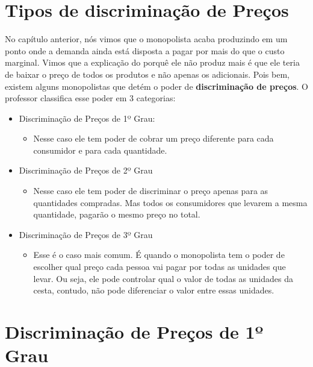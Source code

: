 \documentclass[a4paper,11pt,oneside]{book}
\theoremstyle{definition}
\theoremstyle{break}
\begin{document}
\section{Tipos de discriminação de Preços}

No capítulo anterior, nós vimos que o monopolista acaba produzindo em um ponto onde a demanda ainda está disposta a pagar por mais do que o custo marginal. Vimos que a explicação do porquê ele não produz mais é que ele teria de baixar o preço de todos os produtos e não apenas os adicionais. Pois bem, existem alguns monopolistas que detém o poder de \textbf{discriminação de preços}. O professor classifica esse poder em 3 categorias:

\begin{itemize}
\item Discriminação de Preços de 1º Grau:
	\begin{itemize}
	\item[] Nesse caso ele tem poder de cobrar um preço diferente para cada consumidor e para cada quantidade.
	\end{itemize}
\item Discriminação de Preços de 2º Grau
	\begin{itemize}
	\item[] Nesse caso ele tem poder de discriminar o preço apenas para as quantidades compradas. Mas todos os consumidores que levarem a mesma quantidade, pagarão o mesmo preço no total.
	\end{itemize}
\item Discriminação de Preços de 3º Grau
	\begin{itemize}
	\item[] Esse é o caso mais comum. É quando o monopolista tem o poder de escolher qual preço cada pessoa vai pagar por todas as unidades que levar. Ou seja, ele pode controlar qual o valor de todas as unidades da cesta, contudo, não pode diferenciar o valor entre essas unidades.
	\end{itemize}
\end{itemize}

\section{Discriminação de Preços de 1º Grau}
\end{document}
